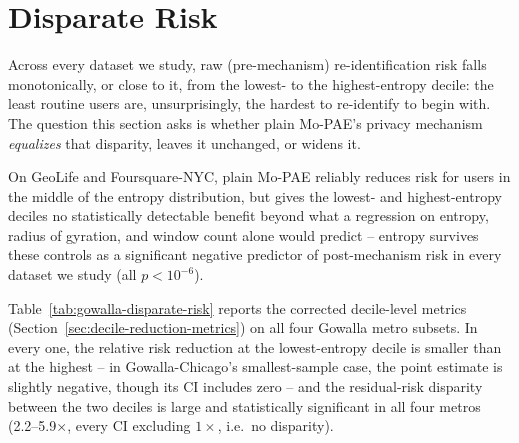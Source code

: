 \section{Disparate Risk}
\label{sec:disparate-risk}


Across every dataset we study, raw (pre-mechanism) re-identification
risk falls monotonically, or close to it, from the lowest- to the
highest-entropy decile: the least routine users are, unsurprisingly,
the hardest to re-identify to begin with. The question this section
asks is whether plain Mo-PAE's privacy mechanism \emph{equalizes} that
disparity, leaves it unchanged, or widens it.

On GeoLife and Foursquare-NYC, plain Mo-PAE reliably reduces risk for
users in the middle of the entropy distribution, but gives the
lowest- and highest-entropy deciles no statistically detectable
benefit beyond what a regression on entropy, radius of gyration, and
window count alone would predict -- entropy survives these controls
as a significant negative predictor of post-mechanism risk in every
dataset we study (all $p < 10^{-6}$).

Table~\ref{tab:gowalla-disparate-risk} reports the corrected
decile-level metrics (Section~\ref{sec:decile-reduction-metrics}) on
all four Gowalla metro subsets. In every one, the relative risk
reduction at the lowest-entropy decile is smaller than at the
highest -- in Gowalla-Chicago's smallest-sample case, the point
estimate is slightly negative, though its CI includes zero -- and the
residual-risk disparity between the two deciles is large and
statistically significant in all four metros (2.2--5.9$\times$, every
CI excluding $1\times$, i.e.\ no disparity).


